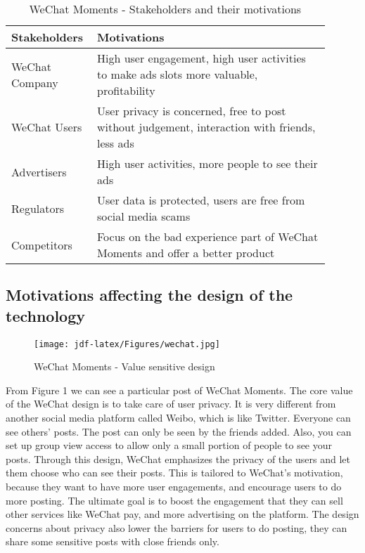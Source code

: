 \documentclass[
	letterpaper, %
]{jdf}
\begin{document}
\begin{table}[h] %
	\caption{WeChat Moments - Stakeholders and their motivations}
	\small %
	\centering %
	\begin{tabular}{L{0.2\linewidth} L{0.7\linewidth} }
		\textbf{Stakeholders} & \textbf{Motivations} \\
		\toprule[0.5pt]
		WeChat Company & High user engagement, high user activities to make ads slots more valuable, profitability \\
		\midrule
		WeChat Users & User privacy is concerned, free to post without judgement, interaction with friends, less ads \\
		\midrule
		Advertisers & High user activities, more people to see their ads \\
		\midrule
		Regulators & User data is protected, users are free from social media scams \\
		\midrule
		Competitors & Focus on the bad experience part of WeChat Moments and offer a better product \\
	\end{tabular}
\end{table}

\subsection{Motivations affecting the design of the technology}
\begin{figure}[h]
	\centering
	\texttt{[image: jdf-latex/Figures/wechat.jpg]}
	\caption{WeChat Moments - Value sensitive design}
	\label{fig:wechat}
\end{figure}

From Figure 1 we can see a particular post of WeChat Moments. The core value of the WeChat design is to take care of user privacy. It is very different from another social media platform called Weibo, which is like Twitter. Everyone can see others' posts. The post can only be seen by the friends added. Also, you can set up group view access to allow only a small portion of people to see your posts. Through this design, WeChat emphasizes the privacy of the users and let them choose who can see their posts. This is tailored to WeChat's motivation, because they want to have more user engagements, and encourage users to do more posting. The ultimate goal is to boost the engagement that they can sell other services like WeChat pay, and more advertising on the platform. The design concerns about privacy also lower the barriers for users to do posting, they can share some sensitive posts with close friends only.
\end{document}
